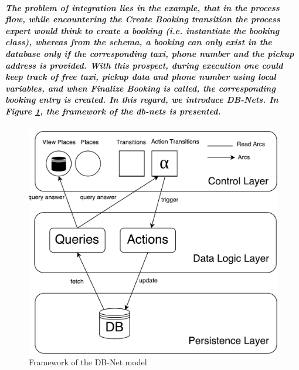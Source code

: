 \subparagraph*{\textnormal{The problem of integration lies in the example, that in the process flow, while encountering the \textit{Create Booking} transition the process expert would think to create a booking (i.e. instantiate the booking class), whereas from the schema, a booking can only exist in the database only if the corresponding taxi, phone number and the pickup address is provided. With this prospect, during execution one could keep track of free taxi, pickup data and phone number using local variables, and when \textit{Finalize Booking} is called, the corresponding booking entry is created. In this regard, we introduce DB-Nets. In Figure \ref{fig:DBN_Framework}, the framework of the db-nets is presented.}}

\begin{figure}[!htbp]
	\centering
	\includegraphics[scale = 0.35]{DBN_Framework.pdf}
	\caption{Framework of the DB-Net model}
	\label{fig:DBN_Framework}
\end{figure}

